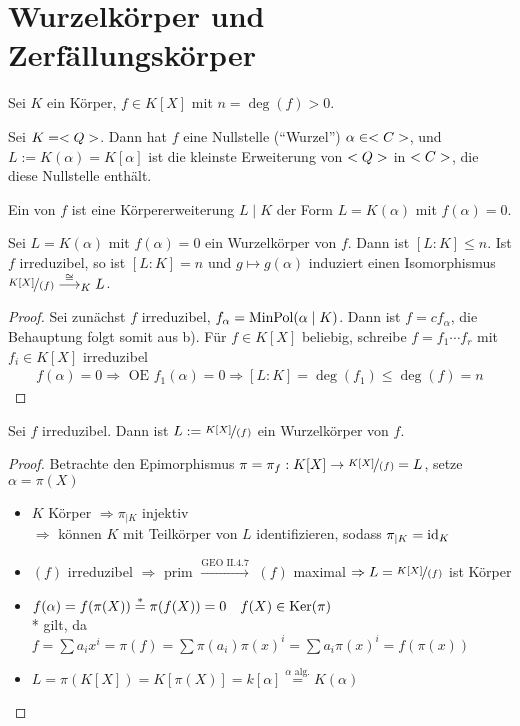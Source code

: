 \section{Wurzelkörper und Zerfällungskörper}
Sei $K$ ein Körper, $f \in K[X]$ mit $n = \deg(f) > 0$.
\begin{example}
	Sei $K=<Q>$. Dann hat $f$ eine Nullstelle (``Wurzel'') $\alpha \in <C>$, und $L:= K(\alpha) = K[\alpha]$ ist die kleinste Erweiterung von $<Q>$ in $<C>$, die diese Nullstelle enthält.
\end{example}
\begin{definition}[Wurzelkörper]
	Ein  von $f$ ist eine Körpererweiterung $L \mid K$ der Form $L = K(\alpha)$ mit $f(\alpha) = 0$.
\end{definition}
\begin{lemma}
	Sei $L = K(\alpha)$ mit $f(\alpha) = 0$ ein Wurzelkörper von $f$. Dann ist $[L:K] \le n$. Ist $f$ irreduzibel, so ist $[L:K] = n$ und $g \mapsto g(\alpha)$ induziert einen Isomorphismus $\lnkset{K[X]}{(f)} \overset{\cong}{\longrightarrow}_K L$.
\end{lemma}
\begin{proof} %
	Sei zunächst $f$ irreduzibel, $f_{\alpha} = \operatorname{MinPol}(\alpha \mid K)$. Dann ist $f = cf_{\alpha}$, die Behauptung folgt somit aus b). Für $f \in K[X]$ beliebig, schreibe $f = f_1\cdots f_r$ mit $f_i \in K[X]$ irreduzibel
	\begin{align*}
		f(\alpha) = 0 \Rightarrow \text{ OE } f_1(\alpha) = 0 \Rightarrow [L:K] = \deg(f_1) \le \deg(f) = n %
	\end{align*}
\end{proof}
\begin{lemma}
	Sei $f$ irreduzibel. Dann ist $L := \lnkset{K[X]}{(f)}$ ein Wurzelkörper von $f$.
\end{lemma}
\begin{proof}
	Betrachte den Epimorphismus $\pi = \pi_f: K[X] \to \lnkset{K[X]}{(f)} = L$, setze $\alpha = \pi(X)$
	\begin{itemize}
		\item $K$ Körper $\Rightarrow \pi_{\mid K}$ injektiv\\
		$\Rightarrow$ können $K$ mit Teilkörper von $L$ identifizieren, sodass $\pi_{\mid K} = \operatorname{id}_K$
		\item $(f)$ irreduzibel $\Rightarrow$ prim $\xrightarrow{\text{GEO II.4.7}}$ $(f)$ maximal $\Rightarrow L = \lnkset{K[X]}{(f)}$ ist Körper
		\item $f(\alpha) = f(\pi(X)) \overset{*}{=} \pi(f(X)) = 0 \quad f(X) \in \operatorname{Ker}(\pi)$\\
		* gilt, da $f = \sum a_i x^i = \pi(f) = \sum \pi(a_i)\pi(x)^i = \sum a_i \pi(x)^i = f(\pi(x))$
		\item $L=\pi(K[X]) = K[\pi(X)] = k[\alpha] \overset{\alpha \text{ alg.}}{=} K(\alpha)$
	\end{itemize}
\end{proof}
